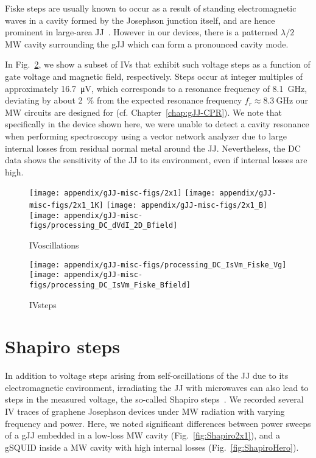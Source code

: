 Fiske steps are usually known to occur as a result of standing electromagnetic waves in a cavity formed by the Josephson junction itself, and are hence prominent in large-area JJ~\cite{krasnovFiskeStepsIntrinsic1999,kimFiskeStepsStudied2005,yabukiSupercurrentVanWaals2016b,liHighQualityEpitaxialMgB2017}.
%
However in our devices, there is a patterned $\lambda/2$ MW cavity surrounding the gJJ which can form a pronounced cavity mode.


In Fig.~\ref{fig:IVsteps}, we show a subset of IVs that exhibit such voltage steps as a function of gate voltage and magnetic field, respectively.
%
Steps occur at integer multiples of approximately \SI{16.7}{\micro\volt}, which corresponds to a resonance frequency of \SI{8.1}{\giga\hertz}, deviating by about \SI{2}{\percent} from the expected resonance frequency $f_r\approx\SI{8.3}{\giga\hertz}$ our MW circuits are designed for (cf. Chapter~\ref{chap:gJJ-CPR}).
%
We note that specifically in the device shown here, we were unable to detect a cavity resonance when performing spectroscopy using a vector network analyzer due to large internal losses from residual normal metal around the JJ.
%
Nevertheless, the DC data shows the sensitivity of the JJ to its environment, even if internal losses are high.

\begin{figure}
	\centering
	\texttt{[image: appendix/gJJ-misc-figs/2x1]}
	\hfill
	\texttt{[image: appendix/gJJ-misc-figs/2x1\_1K]}
	\hfill
	\texttt{[image: appendix/gJJ-misc-figs/2x1\_B]}
	\hfill
	\texttt{[image: appendix/gJJ-misc-figs/processing\_DC\_dVdI\_2D\_Bfield]}
	\caption{IVoscillations}
	\label{fig:IVoscillations}
\end{figure}

\begin{figure}
	\centering
	\texttt{[image: appendix/gJJ-misc-figs/processing\_DC\_IsVm\_Fiske\_Vg]}
	\hfill
	\texttt{[image: appendix/gJJ-misc-figs/processing\_DC\_IsVm\_Fiske\_Bfield]}
	\hfill
	\caption{
		IVsteps
	}
	\label{fig:IVsteps}
\end{figure}


\section{Shapiro steps}\label{sec:shapiro}

In addition to voltage steps arising from self-oscillations of the JJ due to its electromagnetic environment, irradiating the JJ with microwaves can also lead to steps in the measured voltage, the so-called Shapiro steps~\cite{shapiroJosephsonCurrentsSuperconducting1963,kautzNoiseChaosJosephson1996,tinkhamIntroductionSuperconductivity1996,heerscheBipolarSupercurrentGraphene2007a,leeUltimatelyShortBallistic2015,shellyExistenceShapiroSteps2020,larsonZerobiasCrossingsPeculiar2020}.
%
We recorded several IV traces of graphene Josephson devices under MW radiation with varying frequency and power.
%
Here, we noted significant differences between power sweeps of a gJJ embedded in a low-loss MW cavity (Fig.~\ref{fig:Shapiro2x1}), and a gSQUID inside a MW cavity with high internal losses (Fig.~\ref{fig:ShapiroHero}).

